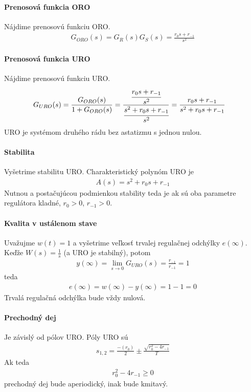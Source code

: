 \documentclass[a4paper, 10pt, ]{article}
\begin{document}
\paragraph{Prenosová funkcia ORO}
Nájdime prenosovú funkciu ORO.
\begin{align}
    G_{ORO}(s) = G_R(s) G_S(s) =  \frac{r_0 s + r_{-1}}{s^2}
\end{align}


\paragraph{Prenosová funkcia URO}
Nájdime prenosovú funkciu URO.
\begin{align}
    \begin{aligned}
    G_{URO}(s)
    &=  \frac{G_{ORO}(s)}{1+G_{ORO}(s)}
    = \frac{   \cfrac{r_0 s + r_{-1}}{s^2}   }{     \cfrac{s^2 + r_0 s + r_{-1}}{s^2}   }
    = \frac{  r_0 s + r_{-1}   }{    s^2 + r_0 s + r_{-1}   }
    \end{aligned}
\end{align}
URO je systémom druhého rádu bez astatizmu s jednou nulou.

\paragraph{Stabilita}
Vyšetrime stabilitu URO. Charakteristický polynóm URO je
\begin{align}
    A(s) =  s^2 + r_0 s + r_{-1}
\end{align}
Nutnou a postačujúcou podmienkou stability teda je ak sú oba parametre regulátora kladné, $r_0 > 0$, $r_{-1} > 0$.

\paragraph{Kvalita v ustálenom stave}
Uvažujme $w(t) = 1$ a vyšetrime veľkosť trvalej regulačnej odchýlky $e(\infty)$. Keďže $W(s) = \frac{1}{s}$ (a URO je stabilný), potom
\begin{align}
    y(\infty) = \lim_{s\to0} G_{URO}(s) = \frac{r_{-1}}{r_{-1}} = 1
\end{align}
teda
\begin{align}
    e(\infty)
    = w(\infty) - y(\infty)
    = 1 - 1
    = 0
\end{align}
Trvalá regulačná odchýlka bude vždy nulová.

\paragraph{Prechodný dej}
Je závislý od pólov URO. Póly URO sú
\begin{align}
    s_{1,2} = \frac{-(r_0)}{2} \pm \frac{ \sqrt{r_0^2 - 4r_{-1} }}{T}
\end{align}
Ak teda
\begin{align}
     r_0^2 - 4r_{-1} \geq 0
\end{align}
prechodný dej bude aperiodický, inak bude kmitavý.
\end{document}
